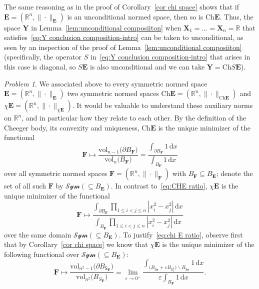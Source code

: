\documentclass[11pt,reqno]{amsart}
\renewcommand{\le}{\leqslant}
\renewcommand{\setminus}{\smallsetminus}
\newcommand{\ud}[0]{\,\mathrm{d}}
\newcommand{\X}{\mathbf X}
\newcommand{\Y}{\mathbf Y}
\newcommand{\e}{\varepsilon}
\newcommand{\R}{\mathbb R}
\theoremstyle{remark}
\newtheorem{problem}[theorem]{Problem}
\newcommand{\sfS}{\mathsf{S}}
\renewcommand{\subset}{\subseteq}
\newcommand{\Ch}{\mathrm{Ch}}
\newcommand{\vol}{\mathrm{vol}}
\renewcommand{\1}{\mathbf 1}
\newcommand{\bfE}{\mathbf{E}}
\newcommand{\bfF}{\mathbf{F}}
\begin{document}
The same reasoning as in the  proof of Corollary~\ref{cor chi space} shows that if $\bfE=(\R^n,\|\cdot\|_\bfE)$ is an unconditional normed space, then so is $\Ch \bfE$. Thus, the space $\Y$ in Lemma~\ref{lem:unconditional composiiton} when $\X_1=\ldots=\X_n=\R$ that satisfies~\eqref{eq:Y conclusion composition-intro} can be taken to unconditional, as seen by an inspection of the proof of Lemma~\ref{lem:unconditional composiiton} (specifically, the operator $S$ in~\eqref{eq:Y conclusion composition-intro} that arises in this case is diagonal, so $S\bfE$ is also unconditional and we can take $\Y=\Ch S \bfE$).



\begin{problem}\label{prob: weyl} We associated above to every symmetric normed space $\bfE=(\R^n,\|\cdot\|_\bfE)$ two symmetric normed spaces $\Ch \bfE=(\R^n,\|\cdot\|_{\Ch\bfE})$ and $\chi\bfE=(\R^n,\|\cdot\|_{\chi\bfE})$. It would be valuable to understand these auxiliary norms on $\R^n$, and in particular how they relate to each other. By the definition of the Cheeger body, its convexity and uniqueness, $\Ch\bfE$ is the unique minimizer of the functional
\begin{equation}\label{eq:CHE ratio}
\bfF\mapsto \frac{\vol_{n-1}\big(\partial B_\bfF\big)}{\vol_n\big(B_\bfF\big)}=\frac{\int_{\partial B_{\bfF}}1\ud x}{\int_{B_\bfF}1\ud x}
\end{equation}
over  all symmetric normed spaces $\bfF=(\R^n,\|\cdot\|_\bfF)$ with $B_\bfF\subset B_\bfE$; denote the set of all such $\bfF$ by $\mathcal{Sym}(\subset B_\bfE)$. In contrast to~\eqref{eq:CHE ratio}, $\chi \bfE$ is the unique minimizer of the functional
\begin{equation}\label{eq:chi E ratio}
\bfF\mapsto \frac{\int_{\partial B_\bfF} \prod_{1\le i<j\le n} |x_i^2-x_j^2|\ud x}{\int_{B_\bfF} \prod_{1\le i<j\le n} |x_i^2-x_j^2|\ud x}
\end{equation}
over the same domain $\mathcal{Sym}(\subset B_\bfE)$. To justify~\eqref{eq:chi E ratio}, observe first that by Corollary~\ref{cor chi space}  we know that $\chi\bfE$ is the unique minimizer of the following functional over $\mathcal{Sym}(\subset B_\bfE)$:
\begin{equation}\label{eq:limiting version noncommutative boundary}
\bfF\mapsto \frac{\vol_{n^2-1}\big(\partial B_{\sfS_\bfF}\big)}{\vol_{n^2}\big(B_{S_\bfF}\big)}=\lim_{\e\to 0^+}\frac{\int_{\big(B_{\sfS_\bfF}+\e B_{\sfS_2^n}\big)\setminus B_{\sfS_\bfF}}1\ud x}{\e\int_{B_{\bfF}}1\ud x}.
\end{equation}

\end{problem}
\end{document}
